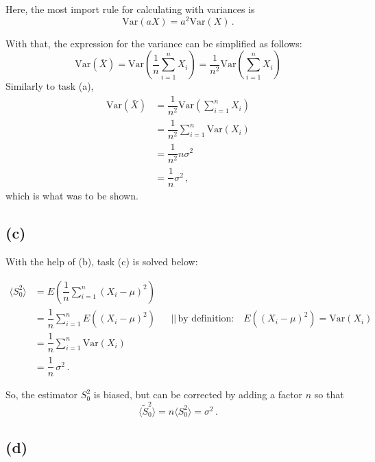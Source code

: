 Here, the most import rule for calculating with variances is
\begin{equation*}
    \text{Var}(aX) = a^2 \text{Var}(X) \,.
\end{equation*}

With that, the expression for the variance can be simplified as follows:
\begin{equation*}
    \text{Var}(\bar{X}) = \text{Var} \left(\dfrac{1}{n} \sum_{i=1}^n X_i \right) = \dfrac{1}{n^2} \text{Var} \left(\sum_{i=1}^n X_i \right)
\end{equation*}
Similarly to task (a),
\begin{align*}
    \text{Var}(\bar{X}) &= \dfrac{1}{n^2} \text{Var} \left(\sum_{i=1}^n X_i \right) \\
                        &= \dfrac{1}{n^2} \sum_{i=1}^n \text{Var}(X_i) \\
                        &= \dfrac{1}{n^2} n \sigma^2 \\
                        &= \dfrac{1}{n} \sigma^2 \,,
\end{align*}
which is what was to be shown.

\subsection*{(c)}

With the help of (b), task (c) is solved below:

\begin{align*}
    \langle S_0^2 \rangle &= E \left( \dfrac{1}{n} \sum_{i=1}^n (X_i - \mu)^2 \right) \\
                          &= \dfrac{1}{n} \sum_{i=1}^n E((X_i - \mu)^2) && \text{||} \, \text{by definition:} \quad E((X_i - \mu)^2) = \text{Var}(X_i) \\
                          &= \dfrac{1}{n} \sum_{i=1}^n \text{Var}(X_i) \\
                          &= \dfrac{1}{n}  \, \sigma^2 \,.
\end{align*}

So, the estimator $S_0^2$ is biased, but can be corrected by adding a factor $n$ so that
\begin{equation*}
    \langle \tilde{S}_0^2 \rangle = n \langle S_0^2 \rangle = \sigma^2 \,.
\end{equation*}

\subsection*{(d)}

